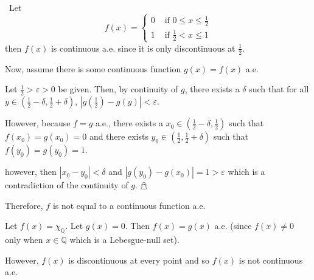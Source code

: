 \documentclass[12pt]{Homework}
\newcommand{\contradiction}{\null\hfill\large{$\mathghost$}\normalsize}
\begin{document}
\begin{solution}$\,$
 Let \[
f(x)=\begin{cases}
0 & \text{ if }0\le x\le\frac{1}{2}\\
1 & \text{ if }\frac{1}{2}<x\le 1
\end{cases}
\]
 then $f(x)$ is continuous a.e. since it is only discontinuous at $\frac{1}{2}$.
 
 Now, assume there is some continuous function $g(x)=f(x)$ a.e.
 
 Let $\frac{1}{2}>\varepsilon>0$ be given. Then, by continuity of $g$, there exists a $\delta$ such that for all $y\in(\frac{1}{2}-\delta,\frac{1}{2}+\delta)$, $|g(\frac{1}{2})-g(y)|<\varepsilon$.
 
 However, because $f=g$ a.e., there exists a $x_0\in (\frac{1}{2}-\delta,\frac{1}{2})$ such that $f(x_0)=g(x_0)=0$ and there exists $y_0\in(\frac{1}{2},\frac{1}{2}+\delta)$ such that $f(y_0)=g(y_0)=1$. 
 
 however, then $|x_0-y_0|<\delta$ and $|g(y_0)-g(x_0)|=1>\varepsilon$ which is a contradiction of the continuity of $g$. \contradiction
 
 Therefore, $f$ is not equal to a continuous function a.e.
 
 Let $f(x)=\chi_\mathbb{Q}$. Let $g(x)=0$. Then $f(x)=g(x)$ a.e. (since $f(x)\not=0$ only when $x\in\mathbb{Q}$ which is a Lebesgue-null set). 

However, $f(x)$ is discontinuous at every point and so $f(x)$ is not continuous a.e.
\end{solution}
\vspace{0.5cm}
\end{document}
